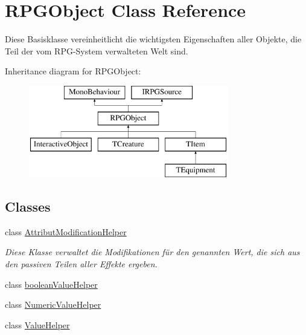 \hypertarget{class_r_p_g_object}{}\section{R\+P\+G\+Object Class Reference}
\label{class_r_p_g_object}


Diese Basisklasse vereinheitlicht die wichtigsten Eigenschaften aller Objekte, die Teil der vom R\+P\+G-\/\+System verwalteten Welt sind.  


Inheritance diagram for R\+P\+G\+Object\+:\begin{figure}[H]
\begin{center}
\leavevmode
\includegraphics[height=4.000000cm]{class_r_p_g_object}
\end{center}
\end{figure}
\subsection*{Classes}
\begin{DoxyCompactItemize}
\item 
class \hyperlink{class_r_p_g_object_1_1_attribut_modification_helper}{Attribut\+Modification\+Helper}
\begin{DoxyCompactList}\small\item\em Diese Klasse verwaltet die Modifikationen für den genannten Wert, die sich aus den passiven Teilen aller Effekte ergeben. \end{DoxyCompactList}\item 
class \hyperlink{class_r_p_g_object_1_1boolean_value_helper}{boolean\+Value\+Helper}
\item 
class \hyperlink{class_r_p_g_object_1_1_numeric_value_helper}{Numeric\+Value\+Helper}
\item 
class \hyperlink{class_r_p_g_object_1_1_value_helper}{Value\+Helper}
\end{DoxyCompactItemize}

